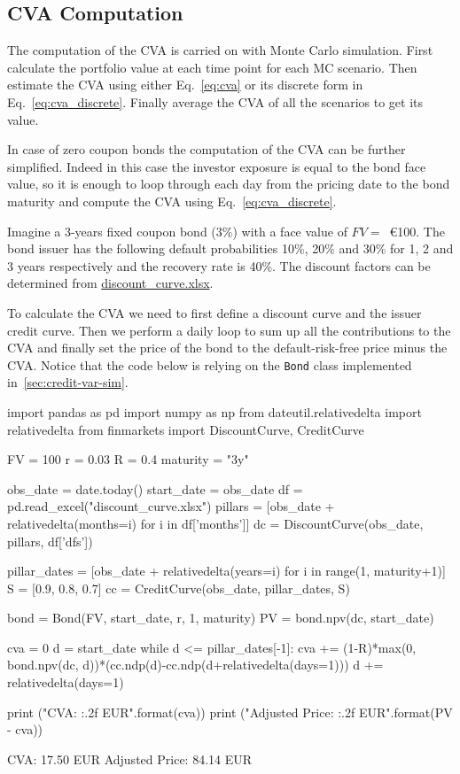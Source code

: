 \subsection{CVA Computation}

The computation of the CVA is carried on with Monte Carlo simulation. 
First calculate the portfolio value at each time point for each MC scenario. Then estimate the CVA using either Eq.~\ref{eq:cva} or its discrete form in Eq.~\ref{eq:cva_discrete}. Finally average the CVA of all the scenarios to get its value.

In case of zero coupon bonds the computation of the CVA can be further simplified. Indeed in this case the investor exposure is equal to the bond face value, so it is enough to loop through each day from the pricing date to the bond maturity and compute the CVA using Eq.~\ref{eq:cva_discrete}.

Imagine a 3-years fixed coupon bond (3\%) with a face value of $FV=$~\euro{100}. The bond issuer has the following default probabilities 10\%, 20\% and 30\% for 1, 2 and 3 years respectively and the recovery rate is 40\%. The discount factors can be determined from \href{https://github.com/matteosan1/finance_course/raw/master/input_files/discount_factors_2022-10-05.xlsx}{discount\_curve.xlsx}. 

To calculate the CVA we need to first define a discount curve and the issuer credit curve. Then we perform a daily loop to sum up all the contributions to the CVA and finally set the price of the bond to the default-risk-free price minus the CVA.
Notice that the code below is relying on the \texttt{Bond} class implemented in~\ref{sec:credit-var-sim}.

\begin{ipython}
import pandas as pd
import numpy as np
from dateutil.relativedelta import relativedelta
from finmarkets import DiscountCurve, CreditCurve

FV = 100
r = 0.03
R = 0.4
maturity = "3y"

obs_date = date.today()
start_date = obs_date
df = pd.read_excel("discount_curve.xlsx")
pillars = [obs_date + relativedelta(months=i) for i in df['months']]
dc = DiscountCurve(obs_date, pillars, df['dfs'])

pillar_dates = [obs_date + relativedelta(years=i) for i in range(1, maturity+1)]
S = [0.9, 0.8, 0.7]
cc = CreditCurve(obs_date, pillar_dates, S)

bond = Bond(FV, start_date, r, 1, maturity)
PV = bond.npv(dc, start_date)

cva = 0
d = start_date
while d <= pillar_dates[-1]:
    cva += (1-R)*max(0, bond.npv(dc, d))*(cc.ndp(d)-cc.ndp(d+relativedelta(days=1)))
    d += relativedelta(days=1)

print ("CVA: {:.2f} EUR".format(cva))
print ("Adjusted Price: {:.2f} EUR".format(PV - cva))
\end{ipython}
\begin{ioutput}
CVA: 17.50 EUR
Adjusted Price: 84.14 EUR
\end{ioutput}

